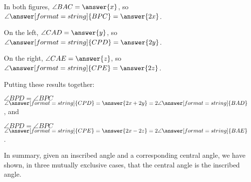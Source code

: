 \documentclass[nooutcomes]{ximera}
\begin{document}
\begin{problem}
In both figures, $\angle BAC = \answer{x}$, so $\angle \answer[format=string]{BPC} = \answer{2x}$.  

On the left, $\angle CAD = \answer{y}$, so $\angle \answer[format=string]{CPD} = \answer{2y}$. 

On the right, $\angle CAE = \answer{z}$, so $\angle \answer[format=string]{CPE} = \answer{2z}$.  

Putting these results together:

 $\angle BPD = \angle BPC$ \wordChoice{\choice[correct]{$+$}\choice{$-$}\choice{$\times$}\choice{$\div$}}$ \angle \answer[format=string]{CPD} 
 = \answer{2x + 2y} = 2 \angle \answer[format=string]{BAD}$, and 

 $\angle BPD = \angle BPC$ \wordChoice{\choice{$+$}\choice[correct]{$-$}\choice{$\times$}\choice{$\div$}} $\angle \answer[format=string]{CPE} 
 = \answer{2x - 2z} = 2 \angle \answer[format=string]{BAE}$.  

In summary, given an inscribed angle and a corresponding central angle, we have shown, in three mutually exclusive cases, that the central angle is 
 the inscribed angle.  
 

\end{problem}
\end{document}
